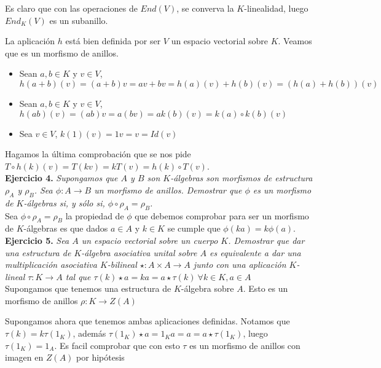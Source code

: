 \documentclass[UTF8]{article}
\begin{document}
Es claro que con las operaciones de \(End(V)\), se converva la \(K\)-linealidad,
luego \(End_K(V)\) es un subanillo.

La aplicación \(h\) está bien definida por ser \(V\) un espacio vectorial sobre
\(K\). Veamos que es un morfismo de anillos.
\begin{itemize}
\item Sean \(a,b \in K\) y \(v \in V\), \(h(a + b)(v) = (a+b)v = av + bv =
  h(a)(v) + h(b)(v) = (h(a) + h(b))(v) \)
\item Sean \(a,b \in K\) y \(v \in V\), \(h(ab)(v) = (ab)v = a(bv) =
  ak(b)(v) = k(a)\circ k(b) (v) \)
\item Sea \(v \in V\), \(k(1)(v) = 1v = v = Id(v)\)
\end{itemize}

Hagamos la última comprobación que se nos pide \(T \circ h(k) (v) = T(kv) =
kT(v) = h(k) \circ T (v)\). \\

\textbf{Ejercicio 4.} \emph{Supongamos que \(A\) y \(B\) son \(K\)-álgebras son
morfismos de estructura \(\rho_A\) y \(\rho_B\). Sea \( \phi:A \to B\) un morfismo
de anillos. Demostrar que \(\phi\) es un morfismo de \(K\)-álgebras si, y sólo si,
\(\phi \circ \rho_A = \rho_B\).} \\

Sea \(\phi \circ \rho_A = \rho_B\) la propiedad de \(\phi\) que debemos
comprobar para ser un morfismo de \(K\)-álgebras es que dados \(a
\in A \)  y \(k \in K \) se cumple que \(\phi(ka) = k\phi(a)\).\\

\textbf{Ejercicio 5.} \emph{Sea \(A\) un espacio vectorial sobre un cuerpo
  \(K\). Demostrar que dar una estructura de \(K\)-álgebra asociativa unital
  sobre \(A\) es equivalente a dar una multiplicación asociativa \(K\)-bilineal \(\star :A
  \times A \to A\) junto con una aplicación \(K\)-lineal \(\tau : K \to A\) tal
  que \(\tau(k)\star a = ka = a \star \tau(k) \ \forall k \in K, a \in A\)}\\

Supongamos que tenemos una estructura de \(K\)-álgebra sobre \(A\). Esto es un
morfismo de anillos \(\rho :K \to Z(A)\)


Supongamos ahora que tenemos ambas aplicaciones definidas. Notamos
que \(\tau (k) = k \tau(1_K)\), además \(\tau(1_K)\star a = 1_Ka = a = a\star
\tau(1_K)\), luego \(\tau(1_K) = 1_A\). Es facil comprobar que con esto \(\tau\)
es un morfismo de anillos con imagen en \(Z(A)\) por hipótesis
\end{document}
